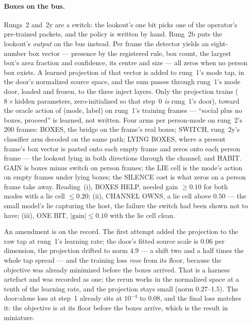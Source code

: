 \documentclass[11pt]{article}
\begin{document}
\paragraph{Boxes on the bus.} Rungs~2 and~2y are a switch: the
lookout's one bit picks one of the operator's pre-trained packets, and
the policy is written by hand. Rung~2b puts the lookout's \emph{output}
on the bus instead. Per frame the detector yields an eight-number box
vector --- presence by the registered rule, box count, the largest
box's area fraction and confidence, its centre and size --- all zeros
when no person box exists. A learned projection of that vector is added
to rung~1's mode tap, in the door's normalized source space, and the sum
passes through rung~1's mode door, loaded and frozen, to the three
inject layers. Only the projection trains ($8\times\text{hidden}$
parameters, zero-initialized so that step~0 \emph{is} rung~1's door),
toward the oracle action of (mode, label) on rung~1's training frames
--- ``social plus no boxes, proceed'' is learned, not written. Four arms
per person-mode on rung~2's 200 frames: BOXES, the bridge on the frame's
real boxes; SWITCH, rung~2y's classifier arm decoded on the same path;
LYING BOXES, where a present frame's box vector is pasted onto each
empty frame and zeros onto each person frame --- the lookout lying in
both directions through the channel; and HABIT. GAIN is boxes minus
switch on person frames; the LIE cell is the mode's action on empty
frames under lying boxes; the SILENCE cost is what zeros on a person
frame take away. Reading~(i), BOXES HELP, needed gain $\ge 0.10$ for
both modes with a lie cell $\le 0.20$; (ii), CHANNEL OWNS, a lie cell
above $0.50$ --- the small model's lie capturing the host, the failure
the switch had been shown not to have; (iii), ONE BIT, $|\text{gain}|
\le 0.10$ with the lie cell clean.

An amendment is on the record. The first attempt added the projection
to the raw tap at rung~1's learning rate; the door's fitted source
scale is $0.06$ per dimension, the projection drifted to norm $4.9$ ---
a shift two and a half times the whole tap spread --- and the training
loss \emph{rose} from its floor, because the objective was already
minimized before the boxes arrived. That is a harness artefact and was
recorded as one; the rerun works in the normalized space at a tenth of
the learning rate, and the projection stays small (norm $0.27$--$1.5$).
The door-alone loss at step~1 already sits at $10^{-4}$ to $0.08$, and
the final loss matches it: the objective is at its floor before the
boxes arrive, which is the result in miniature.
\end{document}
